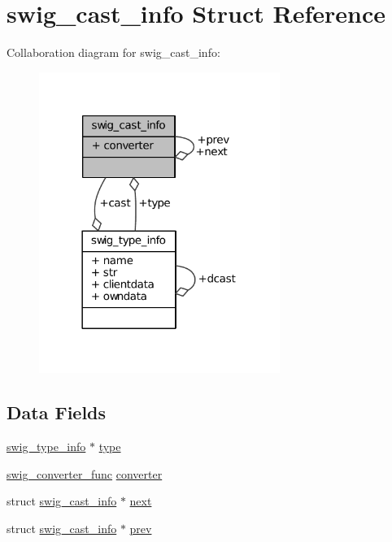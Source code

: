 \hypertarget{structswig__cast__info}{\section{swig\-\_\-cast\-\_\-info Struct Reference}
\label{structswig__cast__info}
}


Collaboration diagram for swig\-\_\-cast\-\_\-info\-:
\nopagebreak
\begin{figure}[H]
\begin{center}
\leavevmode
\includegraphics[width=222pt]{structswig__cast__info__coll__graph}
\end{center}
\end{figure}
\subsection*{Data Fields}
\begin{DoxyCompactItemize}
\item 
\hyperlink{structswig__type__info}{swig\-\_\-type\-\_\-info} $\ast$ \hyperlink{structswig__cast__info_aa19bc251346ad9ae4ecb3b4e34545a5d}{type}
\item 
\hyperlink{libntoh_p_y_t_h_o_n__wrap_8c_a2c314f22b391bfcaff5a11f4b76f66ec}{swig\-\_\-converter\-\_\-func} \hyperlink{structswig__cast__info_ab0c02ae209c86c1a920b1a6cbec7ec52}{converter}
\item 
struct \hyperlink{structswig__cast__info}{swig\-\_\-cast\-\_\-info} $\ast$ \hyperlink{structswig__cast__info_af4349454713002040fd3799016337b36}{next}
\item 
struct \hyperlink{structswig__cast__info}{swig\-\_\-cast\-\_\-info} $\ast$ \hyperlink{structswig__cast__info_ad21cc20a49152bc851275a6747e89493}{prev}
\end{DoxyCompactItemize}


